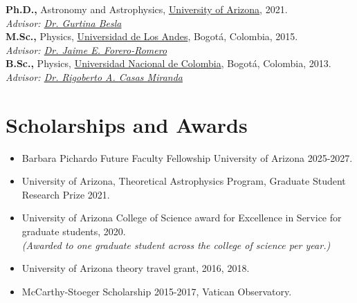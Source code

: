 \documentclass[14pt]{article}
\begin{document}
\textbf{Ph.D.,} Astronomy and Astrophysics, \href{https://www.as.arizona.edu/}{University of Arizona}, 2021.\\
\indent \textit{Advisor: \href{https://sites.google.com/view/thebeslagroup/home}{Dr. Gurtina Besla}}\\

\textbf{M.Sc.,}  Physics, \href{https://fisica.uniandes.edu.co/en}{Universidad de Los Andes}, Bogot\'a, Colombia, 2015.\\
\indent \textit{Advisor: \href{http://wwwprof.uniandes.edu.co/~je.forero/}{Dr. Jaime E. Forero-Romero}}\\

\textbf{B.Sc.,} Physics,
\href{https://unal.edu.co/en.html}{Universidad Nacional de Colombia}, Bogot\'a, Colombia, 2013.\\
\indent \textit{Advisor:
\href{https://www.iau.org/administration/membership/individual/16146/}{Dr.
Rigoberto A. Casas Miranda}}



\section*{Scholarships and Awards}


\begin{itemize}
  \setlength\itemsep{0.0em}
  \renewcommand\labelitemi{$\cdot$}

\item Barbara Pichardo Future Faculty Fellowship University of Arizona 2025-2027. 
\item University of Arizona, Theoretical Astrophysics Program, Graduate Student
Research Prize 2021.
\item University of Arizona College of Science award for Excellence in
Service for graduate students, 2020.\\ 
\indent \textit{(Awarded to one graduate student across the college of
science per year.)}
\item University of Arizona theory travel grant, 2016, 2018. 
\item McCarthy-Stoeger Scholarship 2015-2017, Vatican Observatory.
\end{itemize}
\end{document}
